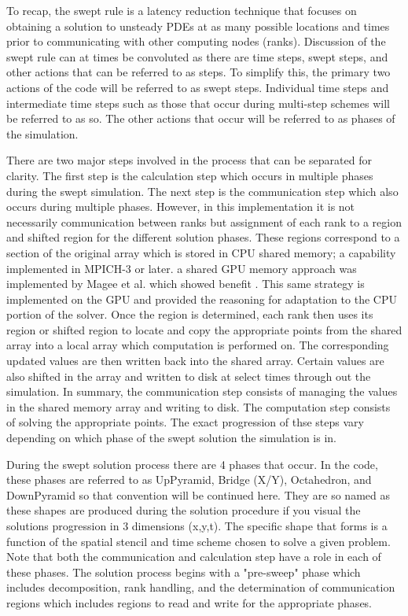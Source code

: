 \documentclass[review]{elsarticle}
\begin{document}
\par
To recap, the swept rule is a latency reduction technique that focuses on obtaining a solution to unsteady PDEs at as many possible locations and times prior to communicating with other computing nodes (ranks). Discussion of the swept rule can at times be convoluted as there are time steps, swept steps, and other actions that can be referred to as steps. To simplify this, the primary two actions of the code will be referred to as swept steps. Individual time steps and intermediate time steps such as those that occur during multi-step schemes will be referred to as so. The other actions that occur will be referred to as phases of the simulation.

\par
There are two major steps involved in the process that can be separated for clarity. The first step is the calculation step which occurs in multiple phases during the swept simulation. The next step is the communication step which also occurs during multiple phases. However, in this implementation it is not necessarily communication between ranks but assignment of each rank to a region and shifted region for the different solution phases. These regions correspond to a section of the original array which is stored in CPU shared memory; a capability implemented in MPICH-3 or later. a shared GPU memory approach was implemented by Magee et al. which showed benefit \cite{Magee2018}. This same strategy is implemented on the GPU and provided the reasoning for adaptation to the CPU portion of the solver. Once the region is determined, each rank then uses its region or shifted region to locate and copy the appropriate points from the shared array into a local array which computation is performed on. The corresponding updated values are then written back into the shared array. Certain values are also shifted in the array and written to disk at select times through out the simulation. In summary, the communication step consists of managing the values in the shared memory array and writing to disk. The computation step consists of solving the appropriate points. The exact progression of thse steps vary depending on which phase of the swept solution the simulation is in.

\par
During the swept solution process there are 4 phases that occur. In the code, these phases are referred to as UpPyramid, Bridge (X/Y), Octahedron, and DownPyramid so that convention will be continued here. They are so named as these shapes are produced during the solution procedure if you visual the solutions progression in 3 dimensions (x,y,t). The specific shape that forms is a function of the spatial stencil and time scheme chosen to solve a given problem. Note that both the communication and calculation step have a role in each of these phases.
The solution process begins with a "pre-sweep" phase which includes decomposition, rank handling, and the determination of communication regions which includes regions to read and write for the appropriate phases.
\end{document}
